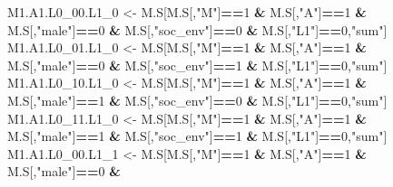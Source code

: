 \documentclass[
]{book}
\newenvironment{Shaded}{\begin{snugshade}}{\end{snugshade}}
\newcommand{\DecValTok}[1]{\textcolor[rgb]{0.00,0.00,0.81}{#1}}
\newcommand{\NormalTok}[1]{#1}
\newcommand{\OtherTok}[1]{\textcolor[rgb]{0.56,0.35,0.01}{#1}}
\newcommand{\SpecialCharTok}[1]{\textcolor[rgb]{0.81,0.36,0.00}{\textbf{#1}}}
\newcommand{\StringTok}[1]{\textcolor[rgb]{0.31,0.60,0.02}{#1}}
\begin{document}
\begin{Shaded}
\begin{Highlighting}[]
\NormalTok{  M1.A1.L0\_00.L1\_0 }\OtherTok{\textless{}{-}}\NormalTok{ M.S[M.S[,}\StringTok{"M"}\NormalTok{]}\SpecialCharTok{==}\DecValTok{1} \SpecialCharTok{\&}\NormalTok{ M.S[,}\StringTok{"A"}\NormalTok{]}\SpecialCharTok{==}\DecValTok{1} \SpecialCharTok{\&}\NormalTok{ M.S[,}\StringTok{"male"}\NormalTok{]}\SpecialCharTok{==}\DecValTok{0} \SpecialCharTok{\&} 
\NormalTok{                            M.S[,}\StringTok{"soc\_env"}\NormalTok{]}\SpecialCharTok{==}\DecValTok{0} \SpecialCharTok{\&}\NormalTok{ M.S[,}\StringTok{"L1"}\NormalTok{]}\SpecialCharTok{==}\DecValTok{0}\NormalTok{,}\StringTok{"sum"}\NormalTok{]}
\NormalTok{  M1.A1.L0\_01.L1\_0 }\OtherTok{\textless{}{-}}\NormalTok{ M.S[M.S[,}\StringTok{"M"}\NormalTok{]}\SpecialCharTok{==}\DecValTok{1} \SpecialCharTok{\&}\NormalTok{ M.S[,}\StringTok{"A"}\NormalTok{]}\SpecialCharTok{==}\DecValTok{1} \SpecialCharTok{\&}\NormalTok{ M.S[,}\StringTok{"male"}\NormalTok{]}\SpecialCharTok{==}\DecValTok{0} \SpecialCharTok{\&} 
\NormalTok{                            M.S[,}\StringTok{"soc\_env"}\NormalTok{]}\SpecialCharTok{==}\DecValTok{1} \SpecialCharTok{\&}\NormalTok{ M.S[,}\StringTok{"L1"}\NormalTok{]}\SpecialCharTok{==}\DecValTok{0}\NormalTok{,}\StringTok{"sum"}\NormalTok{]}
\NormalTok{  M1.A1.L0\_10.L1\_0 }\OtherTok{\textless{}{-}}\NormalTok{ M.S[M.S[,}\StringTok{"M"}\NormalTok{]}\SpecialCharTok{==}\DecValTok{1} \SpecialCharTok{\&}\NormalTok{ M.S[,}\StringTok{"A"}\NormalTok{]}\SpecialCharTok{==}\DecValTok{1} \SpecialCharTok{\&}\NormalTok{ M.S[,}\StringTok{"male"}\NormalTok{]}\SpecialCharTok{==}\DecValTok{1} \SpecialCharTok{\&} 
\NormalTok{                            M.S[,}\StringTok{"soc\_env"}\NormalTok{]}\SpecialCharTok{==}\DecValTok{0} \SpecialCharTok{\&}\NormalTok{ M.S[,}\StringTok{"L1"}\NormalTok{]}\SpecialCharTok{==}\DecValTok{0}\NormalTok{,}\StringTok{"sum"}\NormalTok{]}
\NormalTok{  M1.A1.L0\_11.L1\_0 }\OtherTok{\textless{}{-}}\NormalTok{ M.S[M.S[,}\StringTok{"M"}\NormalTok{]}\SpecialCharTok{==}\DecValTok{1} \SpecialCharTok{\&}\NormalTok{ M.S[,}\StringTok{"A"}\NormalTok{]}\SpecialCharTok{==}\DecValTok{1} \SpecialCharTok{\&}\NormalTok{ M.S[,}\StringTok{"male"}\NormalTok{]}\SpecialCharTok{==}\DecValTok{1} \SpecialCharTok{\&} 
\NormalTok{                            M.S[,}\StringTok{"soc\_env"}\NormalTok{]}\SpecialCharTok{==}\DecValTok{1} \SpecialCharTok{\&}\NormalTok{ M.S[,}\StringTok{"L1"}\NormalTok{]}\SpecialCharTok{==}\DecValTok{0}\NormalTok{,}\StringTok{"sum"}\NormalTok{]}
\NormalTok{  M1.A1.L0\_00.L1\_1 }\OtherTok{\textless{}{-}}\NormalTok{ M.S[M.S[,}\StringTok{"M"}\NormalTok{]}\SpecialCharTok{==}\DecValTok{1} \SpecialCharTok{\&}\NormalTok{ M.S[,}\StringTok{"A"}\NormalTok{]}\SpecialCharTok{==}\DecValTok{1} \SpecialCharTok{\&}\NormalTok{ M.S[,}\StringTok{"male"}\NormalTok{]}\SpecialCharTok{==}\DecValTok{0} \SpecialCharTok{\&} 

\end{Highlighting}
\end{Shaded}
\end{document}

